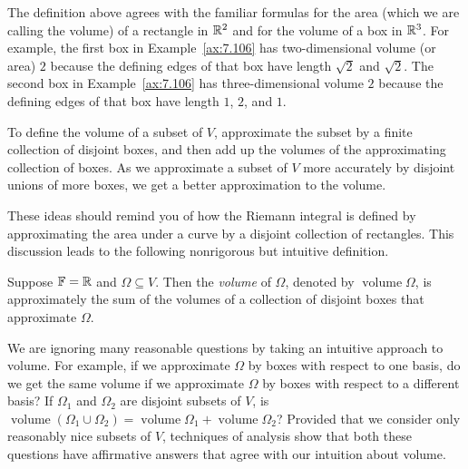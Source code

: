 The definition above agrees with the familiar formulas for the area (which we
are calling the volume) of a rectangle in $\mathbb{R}^2$ and for the volume of a box in
$\mathbb{R}^3$. For example, the first box in Example~\ref{ax:7.106} has
two-dimensional volume (or area) $2$ because the defining edges of that box
have length $\sqrt2$ and $\sqrt2$. The second box in Example~\ref{ax:7.106}
has three-dimensional volume $2$ because the defining edges of that box have
length $1$, $2$, and $1$.

%
To define the volume of a subset of $V$, approximate the subset by a finite
collection of disjoint boxes, and then add up the volumes of the approximating
collection of boxes. As we approximate a subset of $V$ more accurately by
disjoint unions of more boxes, we get a better approximation to the volume.

These ideas should remind you of how the Riemann integral is defined by
approximating the area under a curve by a disjoint collection of rectangles.
This discussion leads to the following nonrigorous but intuitive definition.

\begin{definition}[Volume]\label{ax:7.109}
Suppose $\mathbb{F}=\mathbb{R}$ and $\Omega\subseteq V$. Then the \emph{volume} of $\Omega$,
denoted by $\operatorname{volume}\Omega$, is approximately the sum of the
volumes of a collection of disjoint boxes that approximate $\Omega$.
\end{definition}

%
We are ignoring many reasonable questions by taking an intuitive approach to
volume. For example, if we approximate $\Omega$ by boxes with respect to one
basis, do we get the same volume if we approximate $\Omega$ by boxes with
respect to a different basis? If $\Omega_1$ and $\Omega_2$ are disjoint
subsets of $V$, is
$\operatorname{volume}(\Omega_1\cup\Omega_2)
=\operatorname{volume}\Omega_1+\operatorname{volume}\Omega_2$? Provided that
we consider only reasonably nice subsets of $V$, techniques of analysis show
that both these questions have affirmative answers that agree with our
intuition about volume.

